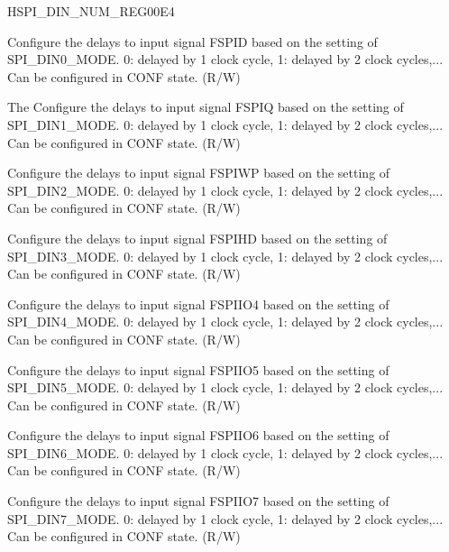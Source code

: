 \begin{register}{H}{SPI\_DIN\_NUM\_REG}{\hexprefix{}00E4}\label{regdesc:SPIDINNUMREG}
%
%
%
%
%
%
%
%
%
\regnewline%
\begin{regdesc}\begin{reglist}
\label{fielddesc:SPIDIN0NUM}\item [SPI\_DIN0\_NUM]
Configure the delays to input signal FSPID based on the setting of SPI\_DIN0\_MODE. 0: delayed by 1 clock cycle, 1: delayed by 2 clock cycles,...  Can be configured in CONF state. (R/W)
\label{fielddesc:SPIDIN1NUM}\item [SPI\_DIN1\_NUM] The Configure the delays to input signal FSPIQ based on the setting of SPI\_DIN1\_MODE. 0: delayed by 1 clock cycle, 1: delayed by 2 clock cycles,...  Can be configured in CONF state. (R/W)
\label{fielddesc:SPIDIN2NUM}\item [SPI\_DIN2\_NUM] Configure the delays to input signal FSPIWP based on the setting of SPI\_DIN2\_MODE. 0: delayed by 1 clock cycle, 1: delayed by 2 clock cycles,...  Can be configured in CONF state. (R/W)
\label{fielddesc:SPIDIN3NUM}\item [SPI\_DIN3\_NUM] Configure the delays to input signal FSPIHD based on the setting of SPI\_DIN3\_MODE. 0: delayed by 1 clock cycle, 1: delayed by 2 clock cycles,...  Can be configured in CONF state. (R/W)
\label{fielddesc:SPIDIN4NUM}\item [SPI\_DIN4\_NUM] Configure the delays to input signal FSPIIO4 based on the setting of SPI\_DIN4\_MODE. 0: delayed by 1 clock cycle, 1: delayed by 2 clock cycles,...  Can be configured in CONF state. (R/W)
\label{fielddesc:SPIDIN5NUM}\item [SPI\_DIN5\_NUM] Configure the delays to input signal FSPIIO5 based on the setting of SPI\_DIN5\_MODE. 0: delayed by 1 clock cycle, 1: delayed by 2 clock cycles,...  Can be configured in CONF state. (R/W)
\label{fielddesc:SPIDIN6NUM}\item [SPI\_DIN6\_NUM] Configure the delays to input signal FSPIIO6 based on the setting of SPI\_DIN6\_MODE. 0: delayed by 1 clock cycle, 1: delayed by 2 clock cycles,...  Can be configured in CONF state. (R/W)
\label{fielddesc:SPIDIN7NUM}\item [SPI\_DIN7\_NUM] Configure the delays to input signal FSPIIO7 based on the setting of SPI\_DIN7\_MODE. 0: delayed by 1 clock cycle, 1: delayed by 2 clock cycles,...  Can be configured in CONF state. (R/W)
\end{reglist}\end{regdesc}
\end{register}


